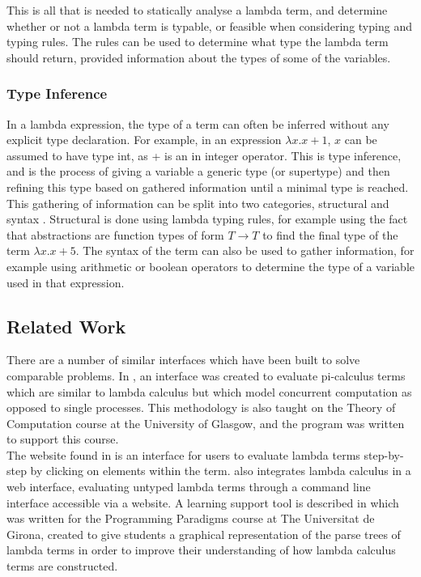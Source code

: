 \documentclass[a4paper,11pt]{report}
\begin{document}
This is all that is needed to statically analyse a lambda term, and determine whether or not a lambda term is typable, or feasible when considering typing and typing rules. The rules can be used to determine what type the lambda term should return, provided information about the types of some of the variables.

\subsubsection{Type Inference}
In a lambda expression, the type of a term can often be inferred without any explicit type declaration. For example, in an expression $\lambda x.x+1$, $x$ can be assumed to have type int, as + is an in integer operator. This is type inference, and is the process of giving a variable a generic type (or supertype) and then refining this type based on gathered information until a minimal type is reached. \cite{Gay2019} \cite{Bezem2008} \cite{Wiesner2011}\\

This gathering of information can be split into two categories, structural and syntax \cite{Bezem2008}. Structural is done using lambda typing rules, for example using the fact that abstractions are function types of form $T \rightarrow T$ to find the final type of the term $\lambda x.x+5$. The syntax of the term can also be used to gather information, for example using arithmetic or boolean operators to determine the type of a variable used in that expression.


\subsection{Related Work}
There are a number of similar interfaces which have been built to solve comparable problems. In \cite{McNab2019}, an interface was created to evaluate pi-calculus terms which are similar to lambda calculus but which model concurrent computation as opposed to single processes. This methodology is also taught on the Theory of Computation course at the University of Glasgow, and the program was written to support this course.\\

The website found in \cite{Kovacsics2019} is an interface for users to evaluate lambda terms step-by-step by clicking on elements within the term. \cite{Gong} also integrates lambda calculus in a web interface, evaluating untyped lambda terms through a command line interface accessible via a website. A learning support tool is described in \cite{Ruiz2009} which was written for the Programming Paradigms course at The Universitat de Girona, created to give students a graphical representation of the parse trees of lambda terms in order to improve their understanding of how lambda calculus terms are constructed.
\end{document}
